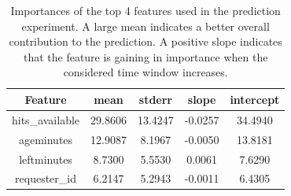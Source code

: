 \begin{table}[t!]
\begin{center}
\scriptsize
\caption {Importances of the top 4 features used in the prediction experiment. A large mean indicates a better overall contribution to the prediction. A positive slope indicates that the feature is gaining in importance when the considered time window increases.}
\begin{tabular}{|c|c|c|c|c|}
\hline
Feature              & mean      & stderr    & slope     & intercept \\
\hline
hits\_available      & 29.8606 & 13.4247 & -0.0257 & 34.4940 \\
ageminutes           & 12.9087 &  8.1967 & -0.0050 & 13.8181 \\
leftminutes          &  8.7300 &  5.5530 & 0.0061 & 7.6290 \\
requester\_id        &  6.2147 &  5.2943 & -0.0011 & 6.4305 \\

\end{tabular}
\end{center}
\end{table}
